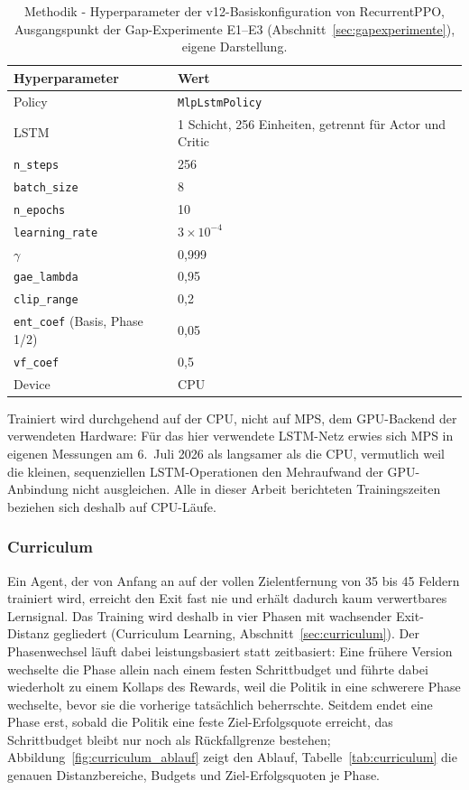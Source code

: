 \documentclass[11pt,a4paper]{article}
\begin{document}
\begin{table}[h]
\centering
\small
\begin{tabular}{@{}ll@{}}
\toprule
\textbf{Hyperparameter} & \textbf{Wert} \\
\midrule
Policy & \texttt{MlpLstmPolicy} \\
LSTM & 1 Schicht, 256 Einheiten, getrennt für Actor und Critic \\
\texttt{n\_steps} & 256 \\
\texttt{batch\_size} & 8 \\
\texttt{n\_epochs} & 10 \\
\texttt{learning\_rate} & $3 \times 10^{-4}$ \\
$\gamma$ & 0,999 \\
\texttt{gae\_lambda} & 0,95 \\
\texttt{clip\_range} & 0,2 \\
\texttt{ent\_coef} (Basis, Phase 1/2) & 0,05 \\
\texttt{vf\_coef} & 0,5 \\
Device & CPU \\
\bottomrule
\end{tabular}
\caption[v12-Basiskonfiguration von RecurrentPPO]{Methodik - Hyperparameter
der v12-Basiskonfiguration von RecurrentPPO, Ausgangspunkt der
Gap-Experimente E1--E3 (Abschnitt~\ref{sec:gapexperimente}), eigene
Darstellung.}
\label{tab:basiskonfig}
\end{table}

Trainiert wird durchgehend auf der CPU, nicht auf MPS, dem GPU-Backend der
verwendeten Hardware: Für das hier verwendete LSTM-Netz erwies sich MPS in
eigenen Messungen am 6.\ Juli 2026 als langsamer als die CPU, vermutlich
weil die kleinen, sequenziellen LSTM-Operationen den Mehraufwand der
GPU-Anbindung nicht ausgleichen. Alle in dieser Arbeit berichteten
Trainingszeiten beziehen sich deshalb auf CPU-Läufe.

\subsubsection{Curriculum}

Ein Agent, der von Anfang an auf der vollen Zielentfernung von 35 bis 45
Feldern trainiert wird, erreicht den Exit fast nie und erhält dadurch kaum
verwertbares Lernsignal. Das Training wird deshalb in vier Phasen mit
wachsender Exit-Distanz gegliedert (Curriculum Learning,
Abschnitt~\ref{sec:curriculum}). Der Phasenwechsel läuft dabei
leistungsbasiert statt zeitbasiert: Eine frühere Version wechselte die
Phase allein nach einem festen Schrittbudget und führte dabei wiederholt zu
einem Kollaps des Rewards, weil die Politik in eine schwerere Phase
wechselte, bevor sie die vorherige tatsächlich beherrschte. Seitdem endet
eine Phase erst, sobald die Politik eine feste Ziel-Erfolgsquote erreicht,
das Schrittbudget bleibt nur noch als Rückfallgrenze bestehen;
Abbildung~\ref{fig:curriculum_ablauf} zeigt den Ablauf,
Tabelle~\ref{tab:curriculum} die genauen Distanzbereiche, Budgets und
Ziel-Erfolgsquoten je Phase.
\end{document}
